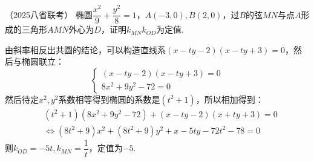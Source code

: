 \begin{example}{（2025八省联考）}{}
    椭圆$\dfrac{x^2}{9}+\dfrac{y^2}{8}=1$，$A(-3,0),B(2,0)$，过$B$的弦$MN$与点$A$形成的三角形$AMN$外心为$D$，证明$k_{MN}k_{OD}$为定值.
\end{example}
\begin{solution}
    由斜率相反出共圆的结论，可以构造直线系$(x-ty-2)(x-ty+3)=0$，然后与椭圆联立：
    \[\begin{cases}(x-ty-2)(x-ty+3)=0\\8x^2+9y^2-72=0\end{cases}\]
    然后待定$x^2,y^2$系数相等得到椭圆的系数是$(t^2+1)$，所以相加得到：
    \begin{align*}&(t^{2}+1)(8x^{2}+9y^{2}-72)+(x-ty-2)(x+ty+3)=0\\&\Leftrightarrow{}(8t^{2}+9)x^{2}+(8t^{2}+9)y^{2}+x-5ty-72t^{2}-78=0\end{align*}
    则$k_{OD}=-5t,k_{MN}=\dfrac1{t}$，定值为$-5$.
\end{solution}
